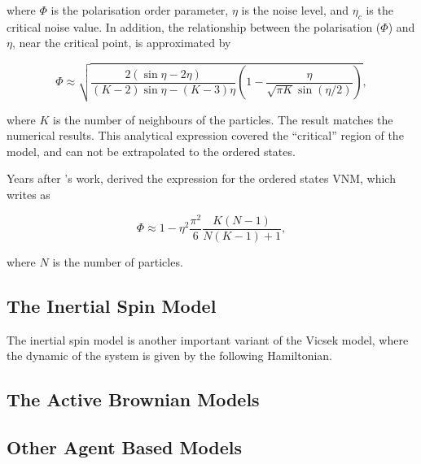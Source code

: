 \documentclass[11pt,twoside]{report}
\begin{document}
\noindent where $\Phi$ is the polarisation order parameter, $\eta$ is the noise level, and $\eta_c$ is the critical noise value. In addition, the relationship between the polarisation ($\Phi$) and $\eta$, near the critical point, is approximated by

\begin{equation}
\Phi \approx \sqrt{
	\frac{2(\sin \eta-2 \eta)}{(K-2) \sin \eta-(K-3) \eta}\left(1-\frac{\eta}{\sqrt{\pi K} \sin (\eta / 2)}\right)
},
\end{equation}

\noindent where $K$ is the number of neighbours of the particles. The result matches the numerical results. This analytical expression covered the ``critical'' region of the model, and can not be extrapolated to the ordered states.

Years after \citeauthor{aldana2003}'s work, \citeauthor{porfiri2014} derived the expression for the ordered states VNM, which writes as \cite{porfiri2014}

\begin{equation}
\Phi \approx 1-\eta^{2} \frac{\pi^{2}}{6} \frac{K(N-1)}{N(K-1)+1},
\end{equation}

\noindent where $N$ is the number of particles.

\subsection{The Inertial Spin Model}

The inertial spin model is another important variant of the Vicsek model, where the dynamic of the system is given by the following Hamiltonian.



\subsection{The Active Brownian Models}

\subsection{Other Agent Based Models}
\end{document}
